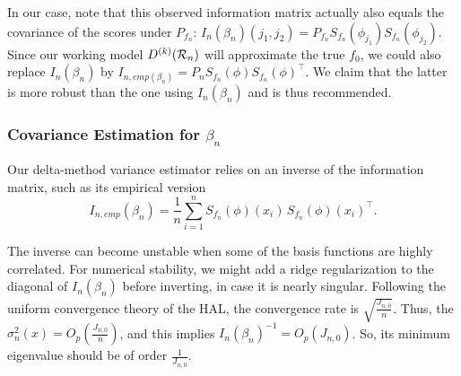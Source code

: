 In our case, note that this observed information matrix actually also equals the covariance of the scores under $P_{f_n}$:
$I_n(\beta_n)(j_1,j_2)=P_{f_n}S_{f_n}(\phi_{j_1})S_{f_n}(\phi_{j_2})$. Since our working model $D^{(k)}({\cal R}_n)$ will approximate the true $f_0$, we could also replace $I_n(\beta_n)$ by $I_{{n,emp}(\beta_n)}=P_n S_{f_n}(\phi)S_{f_n}(\phi)^{\top}$. We claim that the latter is more robust than the one using $I_n(\beta_n)$ and is thus recommended.


\subsubsection{\texorpdfstring{Covariance Estimation for $\beta_n$}{Covariance Estimation for beta\_n}} \label{covariance_beta}
Our delta-method variance estimator relies on an inverse of the information matrix, such as  its empirical version
\[
I_{n,emp}(\beta_n) = \frac{1}{n}\sum_{i=1}^{n} S_{f_n}(\phi)(x_i)\,S_{f_n}(\phi)(x_i)^\top.
\]

The inverse can become unstable when some of the basis functions are highly correlated. 
For numerical stability, we might add a ridge regularization to the diagonal of $I_n(\beta_n)$ before inverting, in case it is nearly singular. Following the uniform convergence theory of the HAL, the convergence rate is $\sqrt{\frac{J_{n,0}}{n}}$. Thus, the $\sigma_n^2(x)=O_p(\frac{J_{n,0}}{n})$, and this implies $I_n(\beta_n)^{-1}=O_p(J_{n,0})$. So, its minimum eigenvalue should be of order $\frac{1}{J_{n,0}}$. 


